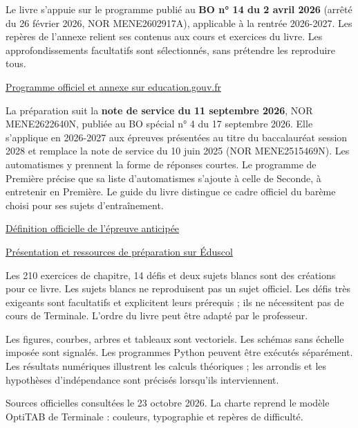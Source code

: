 \thispagestyle{otFront}
\fontsize{10.5}{14.5}\selectfont
{}
Le livre s'appuie sur le programme publié au \textbf{BO n° 14 du 2 avril 2026}
(arrêté du 26 février 2026, NOR MENE2602917A), applicable à la rentrée 2026-2027.
Les repères de l'annexe relient ses contenus aux cours et exercices du livre.
Les approfondissements facultatifs sont sélectionnés, sans prétendre les reproduire tous.\par\vspace{3mm}
\href{https://www.education.gouv.fr/bo/2026/Hebdo14/MENE2602917A}{\textcolor{otNavy}{Programme officiel et annexe sur education.gouv.fr}}\par\vspace{5mm}
La préparation suit la \textbf{note de service du 11 septembre 2026}, NOR MENE2622640N,
publiée au BO spécial n° 4 du 17 septembre 2026. Elle s'applique en 2026-2027 aux
épreuves présentées au titre du baccalauréat session 2028 et remplace la note de service
du 10 juin 2025 (NOR MENE2515469N). Les automatismes y prennent la forme de réponses
courtes. Le programme de Première précise que sa liste d'automatismes s'ajoute à celle
de Seconde, à entretenir en Première. Le guide du livre distingue ce cadre officiel du barème
choisi pour ses sujets d'entraînement.\par\vspace{3mm}
\href{https://www.education.gouv.fr/bo/2026/Special4/MENE2622640N}{\textcolor{otNavy}{Définition officielle de l'épreuve anticipée}}\par\vspace{2mm}
\href{https://eduscol.education.gouv.fr/5688/epreuve-anticipee-de-mathematiques-aux-baccalaureats-general-et-technologique}{\textcolor{otNavy}{Présentation et ressources de préparation sur Éduscol}}\par\vspace{5mm}
Les 210 exercices de chapitre, 14 défis et deux sujets blancs sont des créations pour ce livre.
Les sujets blancs ne reproduisent pas un sujet officiel. Les défis très exigeants sont
facultatifs et explicitent leurs prérequis ; ils ne nécessitent pas de cours de Terminale.
L'ordre du livre peut être adapté par le professeur.\par\vspace{3mm}
Les figures, courbes, arbres et tableaux sont vectoriels. Les schémas sans échelle
imposée sont signalés. Les programmes Python peuvent être exécutés séparément.
Les résultats numériques illustrent les calculs théoriques ; les arrondis et les
hypothèses d'indépendance sont précisés lorsqu'ils interviennent.\par\vspace{5mm}
{\fontsize{9}{12}\selectfont\color{otMuted}Sources officielles consultées le 23 octobre 2026.
La charte reprend le modèle OptiTAB de Terminale : couleurs, typographie et repères de difficulté.}
\clearpage
